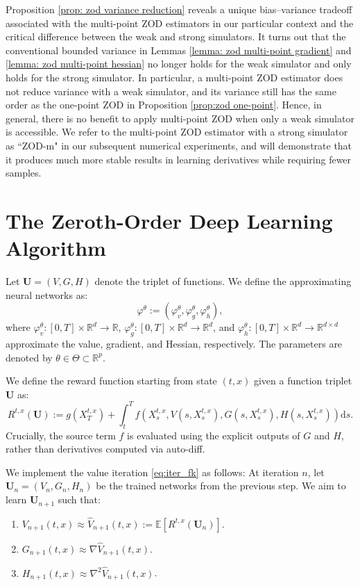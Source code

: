 \documentclass[twoside,11pt]{article}
\newcommand{\dd}{\mathrm{d}}
\newcommand{\E}{\mathbb{E}}
\newcommand{\1}{\mathbf{1}}
\numberwithin{equation}{section}
\begin{document}
Proposition \ref{prop: zod variance reduction} reveals a unique bias--variance tradeoff associated with the multi-point ZOD estimators in our particular context and the critical difference between the weak and strong simulators. It turns out that the conventional bounded variance in Lemmas \ref{lemma: zod multi-point gradient} and \ref{lemma: zod multi-point hessian} no longer holds for the weak simulator and only holds for the strong simulator. In particular, a multi-point ZOD estimator does not reduce variance with a weak simulator, and its variance still has the same order as the one-point ZOD in Proposition \ref{prop:zod one-point}. Hence, in general, there is no benefit to apply multi-point ZOD when only a weak simulator is accessible. We refer to the multi-point ZOD estimator with a strong simulator as ``ZOD-m" in our subsequent numerical experiments, and will demonstrate that it produces much more stable results in learning derivatives while requiring fewer samples.

\section{The Zeroth-Order Deep Learning Algorithm}


Let $\mathbf{U} = (V, G, H)$ denote the triplet of functions. We define the approximating neural networks as:
\[
\varphi^{\theta} := (\varphi^{\theta}_v, \varphi^{\theta}_g, \varphi^{\theta}_h),
\]
where $\varphi^{\theta}_v: [0,T] \times \mathbb{R}^d \to \mathbb{R}$, $\varphi^{\theta}_g: [0,T] \times \mathbb{R}^d \to \mathbb{R}^d$, and $\varphi^{\theta}_h: [0,T] \times \mathbb{R}^d \to \mathbb{R}^{d \times d}$ approximate the value, gradient, and Hessian, respectively. The parameters are denoted by $\theta \in \Theta \subset \mathbb{R}^p$.

We define the reward function starting from state $(t,x)$ given a function triplet $\mathbf{U}$ as:
\begin{equation}
    R^{t,x}(\mathbf{U}) := g(X_T^{t,x}) + \int_t^T f\left( X^{t,x}_s, V(s, X^{t,x}_s), G(s, X^{t,x}_s), H(s, X_s^{t,x})\right) \dd s.
\end{equation}
Crucially, the source term $f$ is evaluated using the explicit outputs of $G$ and $H$, rather than derivatives computed via auto-diff.

We implement the value iteration \eqref{eq:iter_fk} as follows: At iteration $n$, let $\mathbf{U}_n = (V_n, G_n, H_n)$ be the trained networks from the previous step. We aim to learn $\mathbf{U}_{n+1}$ such that:
\begin{enumerate}
    \item $V_{n+1}(t,x) \approx \hat{V}_{n+1}(t,x) := \E[R^{t,x}(\mathbf{U}_n)]$.
    \item $G_{n+1}(t,x) \approx \nabla \hat{V}_{n+1}(t,x)$.
    \item $H_{n+1}(t,x) \approx \nabla^2 \hat{V}_{n+1}(t,x)$.
\end{enumerate}
\end{document}
